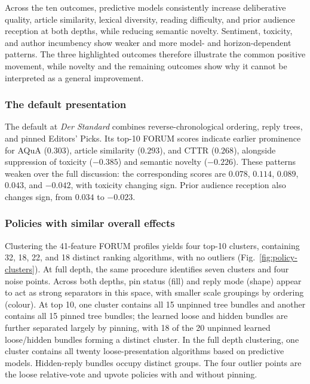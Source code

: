 Across the ten outcomes, predictive models consistently increase deliberative quality, article similarity, lexical diversity, reading difficulty, and prior audience reception at both depths, while reducing semantic novelty. Sentiment, toxicity, and author incumbency show weaker and more model- and horizon-dependent patterns. The three highlighted outcomes therefore illustrate the common positive movement, while novelty and the remaining outcomes show why it cannot be interpreted as a general improvement.

\subsubsection{The default presentation}
The default at \textit{Der Standard} combines reverse-chronological ordering, reply trees, and pinned Editors' Picks. Its top-10 FORUM scores indicate earlier prominence for AQuA ($0.303$), article similarity ($0.293$), and CTTR ($0.268$), alongside suppression of toxicity ($-0.385$) and semantic novelty ($-0.226$). These patterns weaken over the full discussion: the corresponding scores are $0.078$, $0.114$, $0.089$, $0.043$, and $-0.042$, with toxicity changing sign. Prior audience reception also changes sign, from $0.034$ to $-0.023$. 

\subsubsection{Policies with similar overall effects}
Clustering the 41-feature FORUM profiles yields four top-10 clusters, containing 32, 18, 22, and 18 distinct ranking algorithms, with no outliers (Fig.~\ref{fig:policy-clusters}). At full depth, the same procedure identifies seven clusters and four noise points. Across both depths, pin status (fill) and reply mode (shape) appear to act as strong separators in this space, with smaller scale groupings by ordering (colour). At top 10, one cluster contains all 15 unpinned tree bundles and another contains all 15 pinned tree bundles; the learned loose and hidden bundles are further separated largely by pinning, with 18 of the 20 unpinned learned loose/hidden bundles forming a distinct cluster. In the full depth clustering, one cluster contains all twenty loose-presentation algorithms based on predictive models. Hidden-reply bundles occupy distinct groups. The four outlier points are the loose relative-vote and upvote policies with and without pinning.


